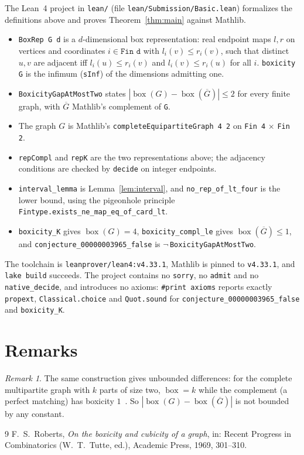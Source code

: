 \documentclass[11pt]{article}
\theoremstyle{plain}
\theoremstyle{definition}
\theoremstyle{remark}
\newtheorem{remark}[theorem]{Remark}
\newcommand{\bx}{\operatorname{box}}
\begin{document}
\sloppy
The Lean~4 project in \texttt{lean/} (file \texttt{lean/Submission/Basic.lean})
formalizes the definitions above and proves Theorem~\ref{thm:main} against Mathlib.
\begin{itemize}
  \item \texttt{BoxRep G d} is a $d$-dimensional box representation: real endpoint
    maps $l,r$ on vertices and coordinates $i\in\texttt{Fin d}$ with
    $l_i(v)\le r_i(v)$, such that distinct $u,v$ are adjacent iff
    $l_i(u)\le r_i(v)$ and $l_i(v)\le r_i(u)$ for all $i$. \texttt{boxicity G} is the
    infimum (\texttt{sInf}) of the dimensions admitting one.
  \item \texttt{BoxicityGapAtMostTwo} states $|\bx(G)-\bx(\overline G)|\le2$ for
    every finite graph, with $\overline G$ Mathlib's complement of \texttt{G}.
  \item The graph $G$ is Mathlib's \texttt{completeEquipartiteGraph 4 2} on
    \texttt{Fin 4} $\times$ \texttt{Fin 2}.
  \item \texttt{repCompl} and \texttt{repK} are the two representations above; the
    adjacency conditions are checked by \texttt{decide} on integer endpoints.
  \item \texttt{interval\_lemma} is Lemma~\ref{lem:interval}, and
    \texttt{no\_rep\_of\_lt\_four} is the lower bound, using the pigeonhole principle
    \texttt{Fintype.exists\_ne\_map\_eq\_of\_card\_lt}.
  \item \texttt{boxicity\_K} gives $\bx(G)=4$, \texttt{boxicity\_compl\_le} gives
    $\bx(\overline G)\le1$, and \texttt{conjecture\_00000003965\_false} is
    $\lnot\,$\texttt{BoxicityGapAtMostTwo}.
\end{itemize}
The toolchain is \texttt{leanprover/lean4:v4.33.1}, Mathlib is pinned to
\texttt{v4.33.1}, and \texttt{lake build} succeeds. The project contains no
\texttt{sorry}, no \texttt{admit} and no \texttt{native\_decide}, and introduces no
axioms: \texttt{\#print axioms} reports exactly \texttt{propext},
\texttt{Classical.choice} and \texttt{Quot.sound} for
\texttt{conjecture\_00000003965\_false} and \texttt{boxicity\_K}.

\fussy
\section{Remarks}

\begin{remark}
The same construction gives unbounded differences: for the complete multipartite
graph with $k$ parts of size two, $\bx=k$ while the complement (a perfect matching)
has boxicity $1$~\cite{roberts}. So $|\bx(G)-\bx(\overline G)|$ is not bounded by any
constant.
\end{remark}

\begin{thebibliography}{9}
 F.~S.~Roberts, \emph{On the boxicity and cubicity of a graph}, in:
  Recent Progress in Combinatorics (W.~T.~Tutte, ed.), Academic Press, 1969,
  301--310.
\end{thebibliography}
\end{document}
